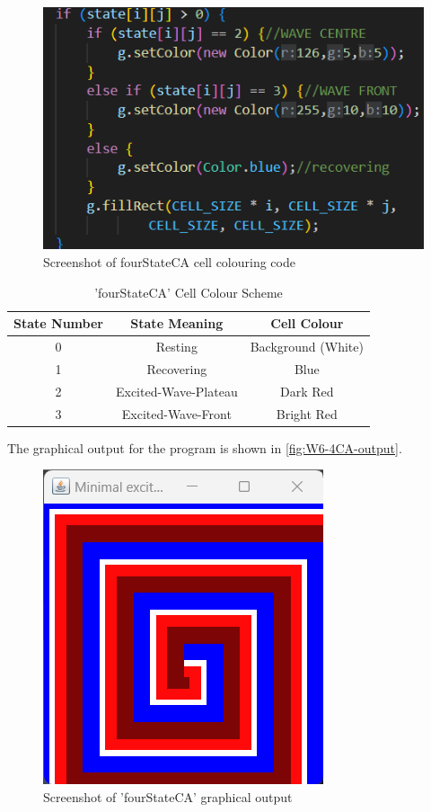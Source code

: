\begin{figure}[H] 
    \centering
    \includegraphics[width=1\columnwidth]{Figures/Week 6/4stateCA-color-code.png}
    \caption{Screenshot of fourStateCA cell colouring code}
    \label{fig:W6-4CA-colour-code}
\end{figure}

\vspace{10mm}
\begin{table}[htbp]
  \centering
  \begin{tabular}{|c|c|c|}
    \hline
    \textbf{State Number} &\textbf{State Meaning} & \textbf{Cell Colour} \\

    \hline
    0 & Resting & Background (White)\\
    \hline
    1 & Recovering & Blue \\
    \hline
    2 & Excited-Wave-Plateau & Dark Red \\
    \hline
    3 & Excited-Wave-Front & Bright Red \\
    \hline
  \end{tabular}
  \caption{'fourStateCA' Cell Colour Scheme}
  \label{tab:state-color-values}
\end{table}

The graphical output for the program is shown in \autoref{fig:W6-4CA-output}.
\begin{figure}[H] 
    \centering
    \includegraphics[width=0.49\columnwidth]{Figures/Week 6/4stateCA-output.png}
    \caption{Screenshot of 'fourStateCA' graphical output}
    \label{fig:W6-4CA-output}
\end{figure}

